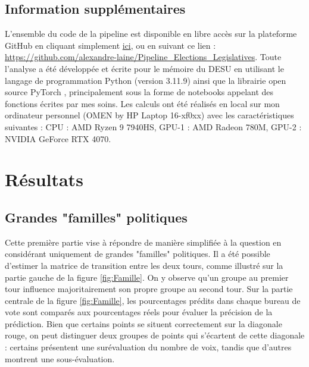 \documentclass[11pt]{article}
\begin{document}
        \subsection*{Information supplémentaires}
            L'ensemble du code de la pipeline est disponible en libre accès sur la plateforme GitHub en cliquant simplement \href{https://github.com/alexandre-laine/Pipeline_Elections_Legislatives}{ici}, ou en suivant ce lien : \url{https://github.com/alexandre-laine/Pipeline_Elections_Legislatives}. Toute l'analyse a été développée et écrite pour le mémoire du DESU en utilisant le langage de programmation Python (version 3.11.9) ainsi que la librairie open source PyTorch \cite{Ansel_Yang_He_Gimelshein_Jain_Voznesensky_Bao_Bell_Berard_Burovski_et_al._2024}, principalement sous la forme de notebooks appelant des fonctions écrites par mes soins. Les calculs ont été réalisés en local sur mon ordinateur personnel (OMEN by HP Laptop 16-xf0xx) avec les caractéristiques suivantes : CPU : AMD Ryzen 9 7940HS, GPU-1 : AMD Radeon 780M, GPU-2 : NVIDIA GeForce RTX 4070.

    \newpage
    \section{Résultats}
        
        \subsection*{Grandes "familles" politiques}
            
        Cette première partie vise à répondre de manière simplifiée à la question en considérant uniquement de grandes "familles" politiques. Il a été possible d'estimer la matrice de transition entre les deux tours, comme illustré sur la partie gauche de la figure \ref{fig:Famille}. On y observe qu'un groupe au premier tour influence majoritairement son propre groupe au second tour. Sur la partie centrale de la figure \ref{fig:Famille}, les pourcentages prédits dans chaque bureau de vote sont comparés aux pourcentages réels pour évaluer la précision de la prédiction. Bien que certains points se situent correctement sur la diagonale rouge, on peut distinguer deux groupes de points qui s'écartent de cette diagonale : certains présentent une surévaluation du nombre de voix, tandis que d'autres montrent une sous-évaluation.
            
\end{document}
